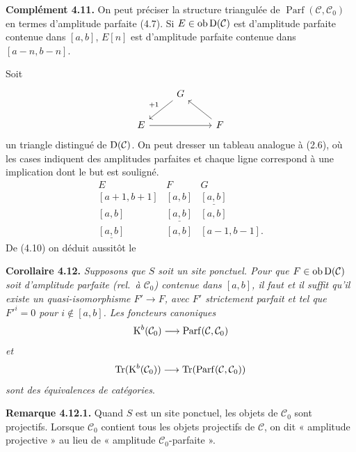 \documentclass[11pt]{article}
\newcommand{\Parf}{\operatorname{Parf}}
\begin{document}
\textbf{Complément 4.11.} On peut préciser la structure triangulée de \(\Parf(\mathcal C,\mathcal C_0)\) en termes d'amplitude parfaite (4.7). Si \(E\in\Ob\Dpx(\mathcal C)\) est d'amplitude parfaite contenue dans \([a,b]\), \(E[n]\) est d'amplitude parfaite contenue dans \([a-n,b-n]\).

Soit
\[
\begin{tikzcd}
& G \arrow[dl,"+1"'] & \\
E \arrow[rr] && F \arrow[ul]
\end{tikzcd}
\]
un
triangle distingué de \(\Dpx(\mathcal C)\). On peut dresser un tableau analogue à (2.6), où les cases indiquent des amplitudes parfaites et chaque ligne correspond à une implication dont le but est souligné.
\[
\begin{array}{ccc}
E&F&G\\[0.3em]
{}[a+1,b+1]&{}[a,b]&\underline{[a,b]}\\
{}[a,b]&\underline{[a,b]}&{}[a,b]\\
\underline{[a,b]}&{}[a,b]&{}[a-1,b-1].
\end{array}
\]
De (4.10) on déduit aussitôt le

\textbf{Corollaire 4.12.} \emph{Supposons que \(S\) soit un site ponctuel. Pour que \(F\in\Ob\Dpx(\mathcal C)\) soit d'amplitude parfaite (rel.\ à \(\mathcal C_0\)) contenue dans \([a,b]\), il faut et il suffit qu'il existe un quasi-isomorphisme \(F'\to F\), avec \(F'\) strictement parfait et tel que \(F'^i=0\) pour \(i\notin[a,b]\). Les foncteurs canoniques}
\[
  \Kpx^b(\mathcal C_0)\longrightarrow\Parf(\mathcal C,\mathcal C_0)
\]
\emph{et}
\[
  \Tr(\Kpx^b(\mathcal C_0))\longrightarrow\Tr(\Parf(\mathcal C,\mathcal C_0))
\]
\emph{sont des équivalences de catégories}.

\textbf{Remarque 4.12.1.} Quand \(S\) est un site ponctuel, les objets de \(\mathcal C_0\) sont projectifs. Lorsque \(\mathcal C_0\) contient tous les objets projectifs de \(\mathcal C\), on dit « amplitude projective » au lieu de « amplitude \(\mathcal C_0\)-parfaite ».



\providecommand{\Cpx}{\mathrm C}
\providecommand{\Kpx}{\mathrm K}
\providecommand{\Dpx}{\mathrm D}
\providecommand{\Ho}{\mathrm H}
\providecommand{\RHom}{\mathrm R\!\operatorname{Hom}}
\renewcommand{\Ob}{\operatorname{ob}}
\providecommand{\qis}{\xrightarrow{\sim}}
\providecommand{\RHom}{\mathrm R\!\Hom}
\providecommand{\Ext}{\operatorname{Ext}}
\providecommand{\Hom}{\operatorname{Hom}}
\providecommand{\Tr}{\operatorname{Tr}}

\providecommand{\Add}{\operatorname{Add}}
\providecommand{\Cart}{\underline{\operatorname{Cart}}}
\providecommand{\perfamp}{\operatorname{parf.amp}}
\providecommand{\perfdim}{\operatorname{parf.dim}}
\providecommand{\toramp}{\operatorname{tor.amp}}
\providecommand{\torf}{\operatorname{torf}}
\providecommand{\injf}{\operatorname{injf}}
\providecommand{\rg}{\operatorname{rg}}
\providecommand{\is}{\mathrm{is}}
\providecommand{\Mod}{\operatorname{Mod}}
\end{document}
